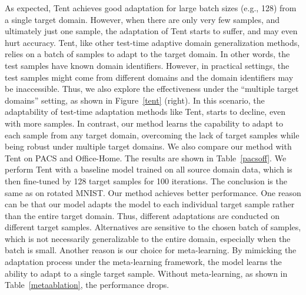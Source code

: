\documentclass{article} \usepackage[table]{xcolor}
\begin{document}
As expected, Tent achieves good adaptation for large batch sizes (e.g., 128) from a single target domain. However, when there are only very few samples, and ultimately just one sample, the adaptation of Tent starts to suffer, and may even hurt accuracy. Tent, like other test-time adaptive domain generalization methods, relies on a batch of samples to adapt to the target domain. In other words, the test samples have known domain identifiers. 
However, in practical settings, the test samples might come from different domains and the domain identifiers may be inaccessible. Thus, we also explore the effectiveness under the ``multiple target domains'' setting, as shown in Figure~\ref{tent} (right). In this scenario, the adaptability of test-time adaptation methods like Tent, starts to decline, even with more samples. In contrast, our method learns the capability to adapt to each sample from any target domain, overcoming the lack of target samples while being robust under multiple target domains.
We also compare our method with Tent on PACS and Office-Home. The results are shown in Table~\ref{pacsoff}. We perform Tent with a baseline model trained on all source domain data, which is then fine-tuned by 128 target samples for 100 iterations. 
The conclusion is the same as on rotated MNIST. Our method achieves better performance. 
One reason can be that our model adapts the model to each individual target sample rather than the entire target domain. Thus, different adaptations are conducted on different target samples. Alternatives are sensitive to the chosen batch of samples, which is not necessarily generalizable to the entire domain, especially when the batch is small. Another reason is our choice for meta-learning. By mimicking the adaptation process under the meta-learning framework, the model learns the ability to adapt to a single target sample. Without meta-learning, as shown in Table~\ref{metaablation}, the performance drops.
\end{document}
